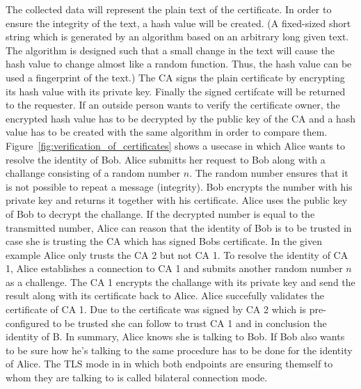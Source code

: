 The collected data will represent the plain text of the certificate. In order to ensure the integrity of the text, 
a hash value will be created. (A fixed-sized short string which is generated by an algorithm based on an arbitrary long given text. The algorithm is designed such that a small change in the text will cause the hash value to change almost like a random function. Thus, the hash value can be used a fingerprint of the text.) The CA signs the plain certificate by encrypting its hash value with its private key. Finally the signed certifcate will be returned to the requester.
%
%
If an outside person wants to verify the certificate owner, the encrypted hash value has to be decrypted by the public key of the CA and a hash value has to be created with the same algorithm in order to compare them.\\


Figure~\ref{fig:verification_of_certificates} shows a usecase in which Alice wants to resolve the identity of Bob. Alice submitts her request to Bob along with a challange consisting of a random number $n$. 
The random number ensures that it is not possible to repeat a message (integrity).
Bob encrypts the number with his private key and returns it together with his certificate. Alice uses the public key of Bob to decrypt the challange. 
If the decrypted number is equal to the transmitted number, Alice can reason that the identity of Bob is to be trusted in case she is trusting the CA which has signed Bobs certificate. 
%
In the given example Alice only trusts the CA 2 but not CA 1.
To resolve the identity of CA 1, Alice establishes a connection to CA 1 and submits another random number $n$ as a challenge.
The CA 1 encrypts the challange with its private key and send the result along with its certificate back to Alice. Alice succefully validates the certificate of CA 1. Due to the certificate was signed by CA 2 which is pre-configured to be trusted she can follow to trust CA 1 and in conclusion the identity of B. In summary, Alice knows she is talking to Bob. If Bob also wants to be sure how he's talking to the same procedure has to be done for the identity of Alice. The TLS mode in in which both endpoints are ensuring themself to whom they are talking to is called bilateral connection mode.\\


